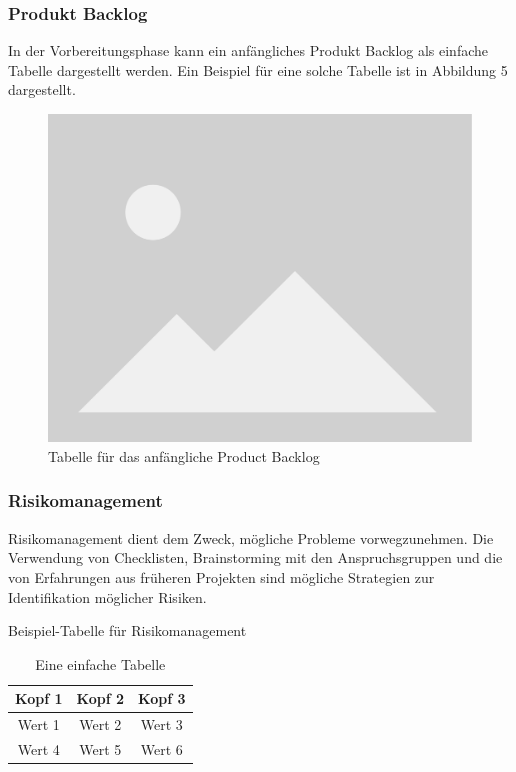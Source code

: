 \documentclass[main.tex]{subfiles} %
\begin{document}
\subsubsection{Produkt Backlog}

In der Vorbereitungsphase kann ein anfängliches Produkt Backlog als einfache Tabelle
dargestellt werden. Ein Beispiel für eine solche Tabelle ist in Abbildung 5 dargestellt.



\begin{figure}[h]
    \centering
    \includegraphics[width=0.7\linewidth]{img/placeholder.png}
    \caption{Tabelle für das anfängliche Product Backlog}
    \label{fig:backlog_table}
\end{figure}


\subsubsection{Risikomanagement}
Risikomanagement dient dem Zweck, mögliche Probleme vorwegzunehmen. Die Verwendung von
Checklisten, Brainstorming mit den Anspruchsgruppen und die von Erfahrungen
aus früheren Projekten sind mögliche Strategien zur Identifikation möglicher Risiken.

\begin{table}[h]
    \centering
    \caption{Beispiel-Tabelle für Risikomanagement}
    \begin{tabular}{|c|c|c|}
        \hline
        Kopf 1 & Kopf 2 & Kopf 3 \\
        \hline
        Wert 1 & Wert 2 & Wert 3 \\
        \hline
        Wert 4 & Wert 5 & Wert 6 \\
        \hline
    \end{tabular}
    \caption{Eine einfache Tabelle}
    \label{tab:meineTabelle}

\end{table}
\end{document}
